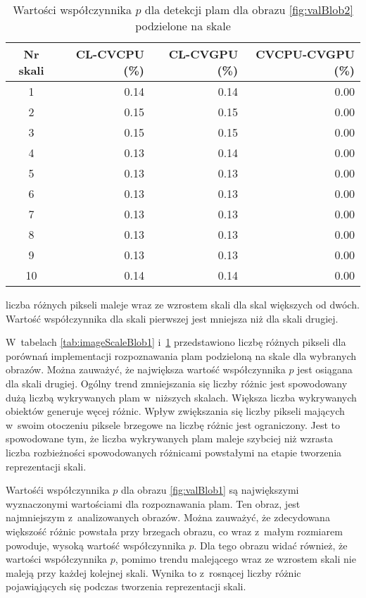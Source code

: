 \begin{center}
\begin{table}
\centering
\caption{Wartości współczynnika $ p $ dla detekcji plam dla obrazu \ref{fig:valBlob2} podzielone na skale}
\label{tab:imageScaleBlob2}
\begin{tabular}{|c|r|r|r|}
\hline
Nr skali & CL-CVCPU (\%) & CL-CVGPU (\%) & CVCPU-CVGPU (\%) \\ \hline
1        & 0.14     & 0.14     & 0.00       \\ \hline
2        & 0.15     & 0.15     & 0.00        \\ \hline
3        & 0.15     & 0.15     & 0.00       \\ \hline
4        & 0.13     & 0.14     & 0.00       \\ \hline
5        & 0.13     & 0.13     & 0.00       \\ \hline
6        & 0.13     & 0.13     & 0.00       \\ \hline
7        & 0.13     & 0.13     & 0.00       \\ \hline
8        & 0.13     & 0.13     & 0.00       \\ \hline
9        & 0.13     & 0.13     & 0.00       \\ \hline
10       & 0.14     & 0.14     & 0.00       \\ \hline
\end{tabular}
\end{table}
\end{center}

liczba różnych pikseli maleje wraz ze wzrostem skali dla skal większych od dwóch. Wartość współczynnika dla skali pierwszej jest mniejsza niż dla skali drugiej. 

W~tabelach \ref{tab:imageScaleBlob1} i~\ref{tab:imageScaleBlob2} przedstawiono liczbę różnych pikseli dla porównań implementacji rozpoznawania plam podzieloną na skale dla wybranych obrazów. Można zauważyć, że największa wartość współczynnika $ p $ jest osiągana dla skali drugiej. Ogólny trend zmniejszania się liczby różnic jest spowodowany dużą liczbą wykrywanych plam w~niższych skalach. Większa liczba wykrywanych obiektów generuje węcej różnic. Wpływ zwiększania się liczby pikseli mających w~swoim otoczeniu piksele brzegowe na liczbę różnic jest ograniczony. Jest to spowodowane tym, że liczba wykrywanych plam maleje szybciej niż wzrasta liczba rozbieżności spowodowanych różnicami powstałymi na etapie tworzenia reprezentacji skali.

Wartośći współczynnika $ p $ dla obrazu \ref{fig:valBlob1} są największymi wyznaczonymi wartościami dla rozpoznawania plam. Ten obraz, jest najmniejszym z~analizowanych obrazów. Można zauważyć, że zdecydowana większość różnic powstała przy brzegach obrazu, co wraz z~małym rozmiarem powoduje, wysoką wartość współczynnika $ p $. Dla tego obrazu widać również, że wartości współczynnika $ p $, pomimo trendu malejącego wraz ze wzrostem skali nie maleją przy każdej kolejnej skali. Wynika to z~rosnącej liczby różnic pojawiąjących się podczas tworzenia reprezentacji skali.

